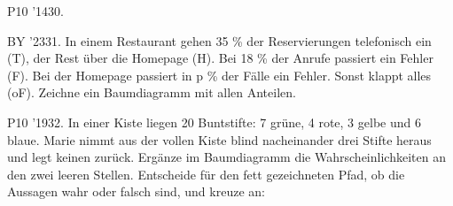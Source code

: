 \documentclass[11pt]{article}
\begin{document}
\begin{pfaufg}{P10 ’14}{30.}{}
\end{pfaufg}
\begin{pfaufg}{BY ’23}{31.}{}
In einem Restaurant gehen 35 \% der Reservierungen telefonisch ein (T), der Rest über die Homepage (H). Bei 18 \% der Anrufe passiert ein Fehler (F). Bei der Homepage passiert in p \% der Fälle ein Fehler. Sonst klappt alles (oF). Zeichne ein Baumdiagramm mit allen Anteilen.
\end{pfaufg}
\pfgruppe{}
\begin{pfaufg}{P10 ’19}{\llap{\textasteriskcentered\,}32.}{}
In einer Kiste liegen 20 Buntstifte: 7 grüne, 4 rote, 3 gelbe und 6 blaue. Marie nimmt aus der vollen Kiste blind nacheinander drei Stifte heraus und legt keinen zurück. Ergänze im Baumdiagramm die Wahrscheinlichkeiten an den zwei leeren Stellen. Entscheide für den fett gezeichneten Pfad, ob die Aussagen wahr oder falsch sind, und kreuze an:

\end{pfaufg}
\end{document}
